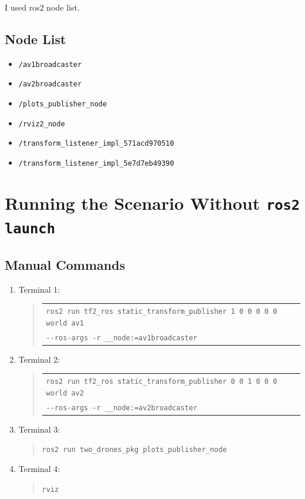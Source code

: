 \documentclass[11pt]{article}
\newcommand{\cmd}[1]{\texttt{#1}}
\begin{document}
I used ros2 node list.

\subsection*{Node List}


\begin{itemize}
  \item \cmd{/av1broadcaster}
  \item \cmd{/av2broadcaster}
  \item \cmd{/plots\_publisher\_node}
  \item \cmd{/rviz2\_node}
  \item \cmd{/transform\_listener\_impl\_571acd970510}
  \item \cmd{/transform\_listener\_impl\_5e7d7eb49390}
\end{itemize}


\section{Running the Scenario Without \cmd{ros2 launch}}


\subsection*{Manual Commands}

\begin{enumerate}
  \item Terminal 1:
    \begin{quote}
      \begin{tabular}{@{}l@{}}
      \verb|ros2 run tf2_ros static_transform_publisher 1 0 0 0 0 0 world av1|\\
      \verb|--ros-args -r __node:=av1broadcaster|
      \end{tabular}
    \end{quote}
  \item Terminal 2:
    \begin{quote}
      \begin{tabular}{@{}l@{}}
      \verb|ros2 run tf2_ros static_transform_publisher 0 0 1 0 0 0 world av2|\\
      \verb|--ros-args -r __node:=av2broadcaster|
      \end{tabular}
    \end{quote}
  \item Terminal 3:
    \begin{quote}
      \verb|ros2 run two_drones_pkg plots_publisher_node|
    \end{quote}
  \item Terminal 4:
    \begin{quote}
      \cmd{rviz}
    \end{quote}
\end{enumerate}
\end{document}
